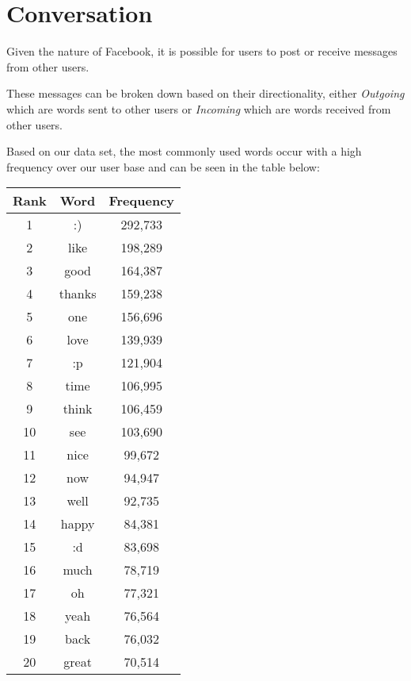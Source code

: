 \section{Conversation}
\label{sec:groups}

Given the nature of Facebook, it is possible for users to post or receive messages from other users.

These messages can be broken down based on their directionality, either \emph{Outgoing} which are words sent to other users or \emph{Incoming} 
which are words received from other users.

Based on our data set, the most commonly used words occur with a high frequency over our user base and can be seen in the table below:

\begin{table}[!htbp]
\begin{minipage}[b]{.5\textwidth}
	\centering
	\begin{tabular}{|c|c|c|} %
		\hline
		\textbf{Rank} & \textbf{Word} & \textbf{Frequency}  \\ \hline
		1 & :) & 292,733 \\ \hline
		2 & like & 198,289 \\ \hline
		3 & good & 164,387 \\ \hline
		4 & thanks & 159,238 \\ \hline
		5 & one & 156,696 \\ \hline
		6 & love & 139,939 \\ \hline
		7 & :p & 121,904 \\ \hline
		8 & time & 106,995 \\ \hline
		9 & think & 106,459 \\ \hline
		10 & see & 103,690 \\ \hline
		11 & nice & 99,672 \\ \hline
		12 & now & 94,947 \\ \hline
		13 & well & 92,735 \\ \hline
		14 & happy & 84,381 \\ \hline
		15 & :d & 83,698 \\ \hline
		16 & much & 78,719 \\ \hline
		17 & oh & 77,321 \\ \hline
		18 & yeah & 76,564 \\ \hline
		19 & back & 76,032 \\ \hline
		20 & great & 70,514 \\ \hline
		\end{tabular}

\end{minipage}
\end{table}
